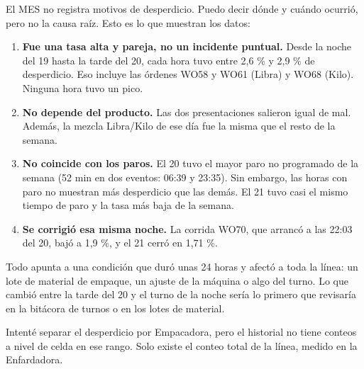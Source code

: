 \begin{singlespace}
{El MES no registra motivos de desperdicio. Puedo decir dónde y cuándo ocurrió, pero no la causa raíz. Esto es lo que muestran los datos:



\begin{enumerate}[leftmargin=1.5em,itemsep=0pt,topsep=2pt]
\item \textbf{Fue una tasa alta y pareja, no un incidente puntual.} Desde la noche del 19 hasta la tarde del 20, cada hora tuvo entre 2,6 \% y 2,9 \% de desperdicio. Eso incluye las órdenes WO58 y WO61 (Libra) y WO68 (Kilo). Ninguna hora tuvo un pico.
\item \textbf{No depende del producto.} Las dos presentaciones salieron igual de mal. Además, la mezcla Libra/Kilo de ese día fue la misma que el resto de la semana.
\item \textbf{No coincide con los paros.} El 20 tuvo el mayor paro no programado de la semana (52 min en dos eventos: 06:39 y 23:35). Sin embargo, las horas con paro no muestran más desperdicio que las demás. El 21 tuvo casi el mismo tiempo de paro y la tasa más baja de la semana.
\item \textbf{Se corrigió esa misma noche.} La corrida WO70, que arrancó a las 22:03 del 20, bajó a 1,9 \%, y el 21 cerró en 1,71 \%.
\end{enumerate}



Todo apunta a una condición que duró unas 24 horas y afectó a toda la línea: un lote de material de empaque, un ajuste de la máquina o algo del turno. Lo que cambió entre la tarde del 20 y el turno de la noche sería lo primero que revisaría en la bitácora de turnos o en los lotes de material.



Intenté separar el desperdicio por Empacadora, pero el historial no tiene conteos a nivel de celda en ese rango. Solo existe el conteo total de la línea, medido en la Enfardadora.}

\end{singlespace}
